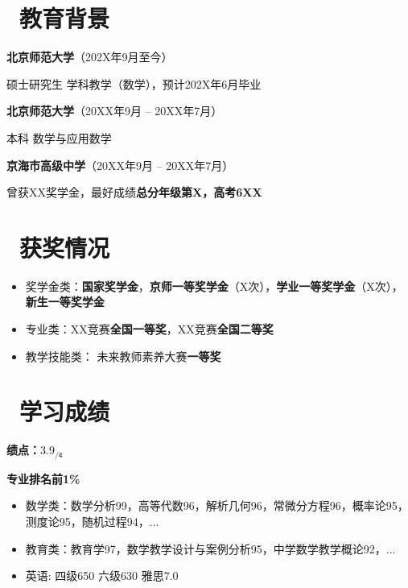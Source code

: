 \documentclass[11pt]{article}
\begin{document}

\section{\makebox[\widthof{\faGraduationCap}][c]{\color{CVBlue}\faGraduationCap}\  教育背景}

\textbf{北京师范大学}（202X年9月至今）

\qquad 硕士研究生 \quad 学科教学（数学），预计202X年6月毕业

\textbf{北京师范大学}（20XX年9月 -- 20XX年7月）

\qquad 本科 \quad 数学与应用数学

\textbf{京海市高级中学}（20XX年9月 -- 20XX年7月） %

\qquad 曾获XX奖学金，最好成绩\textbf{总分年级第X，高考6XX}

\section{\makebox[\widthof{\faGraduationCap}][c]{\color{CVBlue}\faTrophy}\ 获奖情况}
\begin{itemize}
	\item 奖学金类：\textbf{国家奖学金}，\textbf{京师一等奖学金}（X次），\textbf{学业一等奖学金}（X次），\textbf{新生一等奖学金}
	\item 专业类：XX竞赛\textbf{全国一等奖}，XX竞赛\textbf{全国二等奖}
	\item 教学技能类： 未来教师素养大赛\textbf{一等奖}
\end{itemize}


\section{\makebox[\widthof{\faGraduationCap}][c]{\color{CVBlue}\faFileText}\ 学习成绩}
\textbf{绩点：$\mathsf{3.9_{/4}}$} \

\textbf{专业排名前1\%}
\begin{itemize}[parsep=0.5ex]
	\item 数学类：数学分析99，高等代数96，解析几何96，常微分方程96，概率论95，测度论95，随机过程94，...
	\item 教育类：教育学97，数学教学设计与案例分析95，中学数学教学概论92，...
	\item 英语: 四级650 六级630 雅思7.0
\end{itemize}
\end{document}
